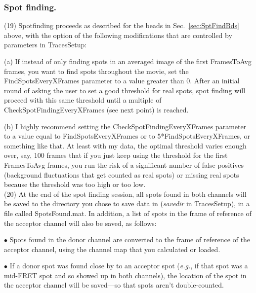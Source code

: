 \documentclass[11pt]{article}
\begin{document}
\subsubsection{Spot finding.}

\noindent (19) Spotfinding proceeds as described for the beads in Sec.~\ref{sec:SptFindBds} above, with the option of the following modifications that are controlled by parameters in TracesSetup:

(a) If instead of only finding spots in an averaged image of the first FramesToAvg frames, you want to find spots throughout the movie, set the FindSpotsEveryXFrames parameter to a value greater than 0.  After an initial round of asking the user to set a good threshold for real spots, spot finding will proceed with this same threshold until a multiple of CheckSpotFindingEveryXFrames (see next point) is reached.

(b) I highly recommend setting the CheckSpotFindingEveryXFrames parameter to a value equal to FindSpotsEveryXFrames or to 5*FindSpotsEveryXFrames, or something like that.  At least with my data, the optimal threshold varies enough over, say, 100 frames that if you just keep using the threshold for the first FramesToAvg frames, you run the risk of a significant number of false positives (background fluctuations that get counted as real spots) or missing real spots because the threshold was too high or too low.  %
\\

\noindent (20) At the end of the spot finding session, all spots found in both channels will be saved to the directory you chose to save data in ({\it savedir} in TracesSetup), in a file called SpotsFound.mat.  In addition, a list of spots in the frame of reference of the acceptor channel will also be saved, as follows: 

$\bullet$ Spots found in the donor channel are converted to the frame of reference of the acceptor channel, using the channel map that you calculated or loaded.

$\bullet$ If a donor spot was found close by to an acceptor spot ({\it e.g.}, if that spot was a mid-FRET spot and so showed up in both channels), the location of the spot in the acceptor channel will be saved---so that spots aren't double-counted.  
\end{document}
